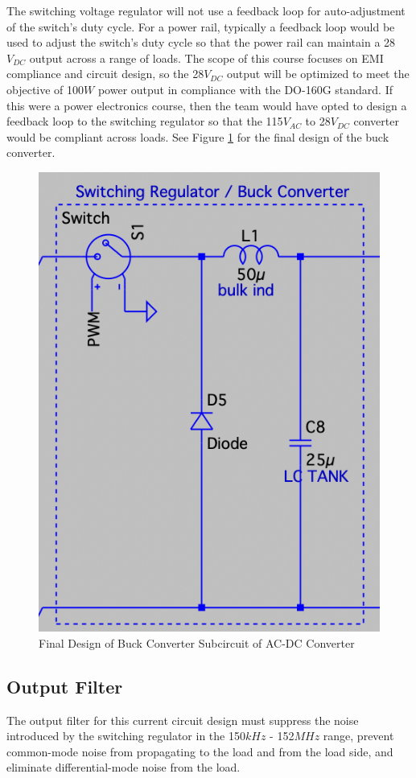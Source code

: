 \documentclass[conference]{IEEEtran}
\begin{document}
The switching voltage regulator will not use a feedback loop for auto-adjustment of the switch's duty cycle. For a power rail, typically a feedback loop would be used to adjust the switch's duty cycle so that the power rail can maintain a 28$V_{DC}$ output across a range of loads. The scope of this course focuses on EMI compliance and circuit design, so the 28$V_{DC}$ output will be optimized to meet the objective of 100$W$ power output in compliance with the DO-160G standard. If this were a power electronics course, then the team would have opted to design a feedback loop to the switching regulator so that the 115$V_{AC}$ to 28$V_{DC}$ converter would be compliant across loads. See Figure \ref{fig:buck_converter_final_design_diagram} for the final design of the buck converter.

\begin{figure}[htp]
    \centering
    \includegraphics[width=0.7\linewidth]{buck_converter_final_design.png}
    \caption{Final Design of Buck Converter Subcircuit of AC-DC Converter}
    \label{fig:buck_converter_final_design_diagram}
\end{figure}

\FloatBarrier

\subsection{Output Filter}
The output filter for this current circuit design must suppress the noise introduced by the switching regulator in the 150${kHz}$ - 152${MHz}$ range, prevent common-mode noise from propagating to the load and from the load side, and eliminate differential-mode noise from the load. 
\end{document}
